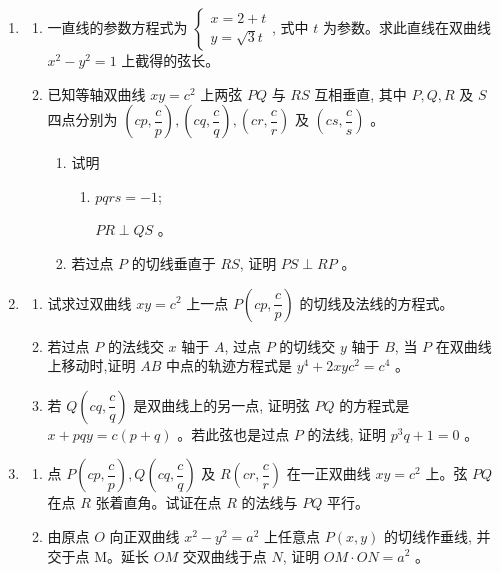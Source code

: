 \documentclass[10pt]{article}
\begin{document}
\begin{enumerate}
  \item \begin{enumerate}
    \item 一直线的参数方程式为 $\left\{\begin{array}{l}x=2+t \\ y=\sqrt{3} t\end{array}\right.$, 式中 $t$ 为参数。求此直线在双曲线 $x^{2}-y^{2}=1$ 上截得的弦长。

    \item 已知等轴双曲线 $x y=c^{2}$ 上两弦 $PQ$ 与 $RS$ 互相垂直, 其中 $P, Q, R$ 及 $S$ 四点分别为 $\left(c p, \dfrac{c}{p}\right),\left(c q, \dfrac{c}{q}\right),\left(c r, \dfrac{c}{r}\right)$ 及 $\left(c s, \dfrac{c}{s}\right)$ 。
    
    \begin{enumerate}
      \item 试明 
      \begin{enumerate}
        \item $pqrs =-1$;
    
        $PR \perp QS$ 。
      \end{enumerate}
      
      \item 若过点 $P$ 的切线垂直于 $R S$, 证明 $P S \perp R P$ 。
    \end{enumerate}
  \end{enumerate}

  \item \begin{enumerate}
    \item 试求过双曲线 $x y=c^{2}$ 上一点 $P\left(c p, \dfrac{c}{p}\right)$ 的切线及法线的方程式。
    \item 若过点 $P$ 的法线交 $x$ 轴于 $A$, 过点 $P$ 的切线交 $y$ 轴于 $B$, 当 $P$ 在双曲线上移动时,证明 $AB$ 中点的轨迹方程式是 $y^{4}+2 x y c^{2}=c^{4}$ 。
    \item 若 $Q\left(c q, \dfrac{c}{q}\right)$ 是双曲线上的另一点, 证明弦 $PQ$ 的方程式是 $x+p q y=c(p+q)$ 。若此弦也是过点 $P$ 的法线, 证明 $p^{3} q+1=0$ 。
  \end{enumerate}

  \item \begin{enumerate}
    \item 点 $P\left(c p, \dfrac{c}{p}\right), Q\left(c q, \dfrac{c}{q}\right)$ 及 $R\left(c r, \dfrac{c}{r}\right)$ 在一正双曲线 $x y=c^{2}$ 上。弦 $PQ$ 在点 $R$ 张着直角。试证在点 $R$ 的法线与 $PQ$ 平行。
    \item 由原点 $O$ 向正双曲线 $x^{2}-y^{2}=a^{2}$ 上任意点 $P(x, y)$ 的切线作垂线, 并交于点 M。延长 $OM$ 交双曲线于点 $N$, 证明 $OM \cdot ON=a^{2}$ 。
  \end{enumerate}


\end{enumerate}
\end{document}
